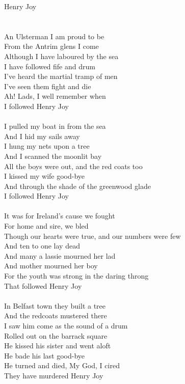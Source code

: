 \documentclass[letterpaper,9pt]{article}
\begin{document}
\newpage
{}
\huge
Henry Joy\\
\\
\Large
\noindent
\\An Ulsterman I am proud to be 
\\From the Antrim glens I come
\\Although I have laboured by the sea
\\I have followed fife and drum
\\I've heard the martial tramp of men
\\I've seen them fight and die
\\Ah! Lads, I well remember when
\\I followed Henry Joy
\\
\\I pulled my boat in from the sea
\\And I hid my sails away
\\I hung my nets upon a tree
\\And I scanned the moonlit bay
\\All the boys were out, and the red coats too
\\I kissed my wife good-bye
\\And through the shade of the greenwood glade
\\I followed Henry Joy
\\
\\It was for Ireland's cause we fought
\\For home and sire, we bled
\\Though our hearts were true, and our numbers were few
\\And ten to one lay dead
\\And many a lassie mourned her lad
\\And mother mourned her boy
\\For the youth was strong in the daring throng
\\That followed Henry Joy
\\
\\In Belfast town they built a tree
\\And the redcoats mustered there
\\I saw him come as the sound of a drum
\\Rolled out on the barrack square
\\He kissed his sister and went aloft
\\He bade his last good-bye
\\He turned and died, My God, I cired
\\They have murdered Henry Joy
\end{document}
